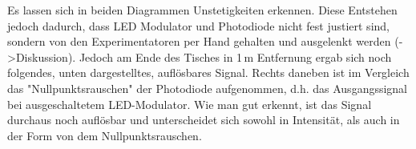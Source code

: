 \documentclass{scrartcl}						%
\begin{document}
			Es lassen sich in beiden Diagrammen Unstetigkeiten erkennen. Diese Entstehen jedoch dadurch, dass LED Modulator und Photodiode nicht fest justiert sind, sondern von den Experimentatoren per Hand gehalten und ausgelenkt werden (->Diskussion).
			Jedoch am Ende des Tisches in 1\,m Entfernung ergab sich noch folgendes, unten dargestelltes, auflösbares Signal. Rechts daneben ist im Vergleich das "Nullpunktsrauschen" der Photodiode aufgenommen, d.h. das Ausgangssignal bei ausgeschaltetem LED-Modulator. Wie man gut erkennt, ist das Signal durchaus noch auflösbar und unterscheidet sich sowohl in Intensität, als auch in der Form von dem Nullpunktsrauschen.\clearpage
			\begin{figure}[h!t!]
					\centering

\end{figure}
\end{document}
